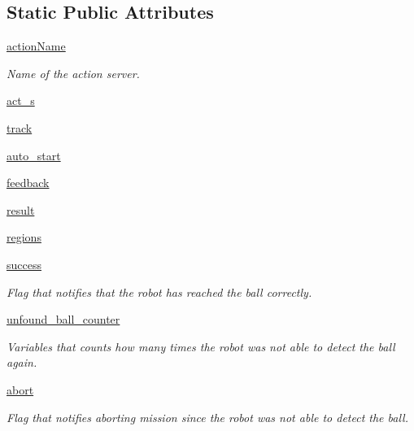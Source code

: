 \subsection*{Static Public Attributes}
\begin{DoxyCompactItemize}
\item 
\hyperlink{classtrack_1_1TrackAction_abb57579f14aa39d1cc0f4379382390a6}{action\+Name}
\begin{DoxyCompactList}\small\item\em Name of the action server. \end{DoxyCompactList}\item 
\hyperlink{classtrack_1_1TrackAction_ae1870a4393e99629a3835f563374152e}{act\+\_\+s}
\item 
\hyperlink{classtrack_1_1TrackAction_a3d89a5a6bf3daf63df4b690e4c9a84a8}{track}
\item 
\hyperlink{classtrack_1_1TrackAction_aeb30f796983b2999ad62d71535795668}{auto\+\_\+start}
\item 
\hyperlink{classtrack_1_1TrackAction_acce0064c9d83a91f00d92a854014cdf5}{feedback}
\item 
\hyperlink{classtrack_1_1TrackAction_ae62bfb3233b566df94fde636d8d26877}{result}
\item 
\hyperlink{classtrack_1_1TrackAction_aca76f9e5333f65cf2da37f2b90d5f193}{regions}
\item 
\hyperlink{classtrack_1_1TrackAction_a8c79189ba62cf316bffaa4c00b0320fe}{success}
\begin{DoxyCompactList}\small\item\em Flag that notifies that the robot has reached the ball correctly. \end{DoxyCompactList}\item 
\hyperlink{classtrack_1_1TrackAction_aabc16f100d1f260d6712d8d74e055fda}{unfound\+\_\+ball\+\_\+counter}
\begin{DoxyCompactList}\small\item\em Variables that counts how many times the robot was not able to detect the ball again. \end{DoxyCompactList}\item 
\hyperlink{classtrack_1_1TrackAction_a4fac0918d826dc6cbf110784c8fcda99}{abort}
\begin{DoxyCompactList}\small\item\em Flag that notifies aborting mission since the robot was not able to detect the ball. \end{DoxyCompactList}\item 

\end{DoxyCompactItemize}
